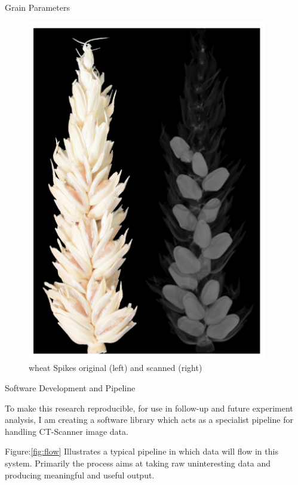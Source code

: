 \documentclass[final]{beamer}
\begin{document}
\begin{frame}{}
\begin{textblock}{28}
\begin{block}{Grain Parameters}
\begin{multicols}{2}
        \begin{figure}[htb]
          \centering
          \includegraphics[width=10.5cm]{collection.png}
          \caption{\label{fig:3d} wheat Spikes original (left) and scanned (right)}
        \end{figure}

      \end{multicols}

    \end{block}

    \begin{block}{Software Development and Pipeline}
      \begin{multicols}{2}

      To make this research reproducible, for use in follow-up and future experiment analysis,
      I am creating a software library which acts as a specialist pipeline for handling CT-Scanner
      image data.

      \vspace{0.5cm}

      Figure:\ref{fig:flow} Illustrates a typical pipeline in which data will flow in this system.
      Primarily the process aims at taking raw uninteresting data and producing meaningful and useful
      output.


\end{multicols}
\end{block}
\end{textblock}
\end{frame}
\end{document}
